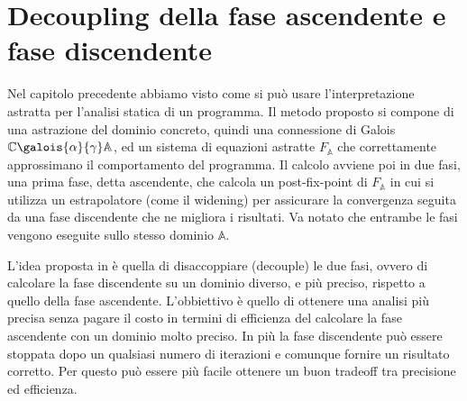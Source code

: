 \chapter{Decoupling della fase ascendente e fase discendente}\label{chapter:decoupling}

Nel capitolo precedente abbiamo visto come si può usare l'interpretazione astratta per l'analisi statica di un programma. Il metodo proposto si compone di una astrazione del dominio concreto, quindi una connessione di Galois \(\mathbb{C}\galois{\alpha}{\gamma}\mathbb{A}\),  ed un sistema di equazioni  astratte \(F_{\mathbb{A}}\) che correttamente approssimano il comportamento del programma. Il calcolo avviene poi in due fasi, una prima fase, detta ascendente, che calcola un post-fix-point di \(F_{\mathbb{A}}\) in cui si utilizza un estrapolatore (come il widening) per assicurare la convergenza seguita da una fase discendente che ne migliora i risultati. Va notato che entrambe le fasi vengono eseguite sullo stesso dominio \(\mathbb{A}\).

L'idea proposta in \cite{DBLP:conf/aplas/ArceriMZ22} è quella di disaccoppiare (decouple) le due fasi, ovvero di calcolare la fase discendente su un dominio diverso, e più preciso, rispetto a quello della fase ascendente. L'obbiettivo è quello di ottenere una analisi più precisa senza pagare il costo in termini di efficienza del calcolare la fase ascendente con un dominio molto preciso. In più la fase discendente può essere stoppata dopo un qualsiasi numero di iterazioni e comunque fornire un risultato corretto. Per questo può essere più facile ottenere un buon tradeoff tra precisione ed efficienza.

